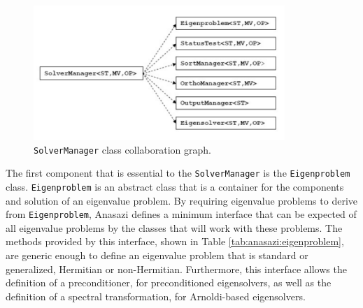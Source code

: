 \documentclass[acmtoms,acmnow]{acmtrans2m}
\newcommand{\aspace}[1]{\texttt{#1}}
\begin{document}
\begin{figure}[htb]
\label{fig:solverColl}
\begin{center}
\includegraphics[height=2in]{anasazi_slvr_collaborations.pdf}
\end{center}
\caption{\aspace{SolverManager} class collaboration graph.}
\end{figure}

The first component that is essential to the \aspace{SolverManager} is the
\aspace{Eigenproblem} class. \aspace {Eigenproblem} is an abstract class that is a
container for the components and solution of an eigenvalue problem. By requiring
eigenvalue problems to derive from \aspace{Eigenproblem}, Anasazi defines a minimum
interface that can be expected of all eigenvalue problems by the classes that will work
with these problems. The methods provided by this interface, shown in Table
\ref{tab:anasazi:eigenproblem}, are generic enough to define an eigenvalue problem that is
standard or generalized, Hermitian or non-Hermitian. Furthermore, this interface allows
the definition of a preconditioner, for preconditioned eigensolvers, as well as the
definition of a spectral transformation, for Arnoldi-based eigensolvers. 
\end{document}
